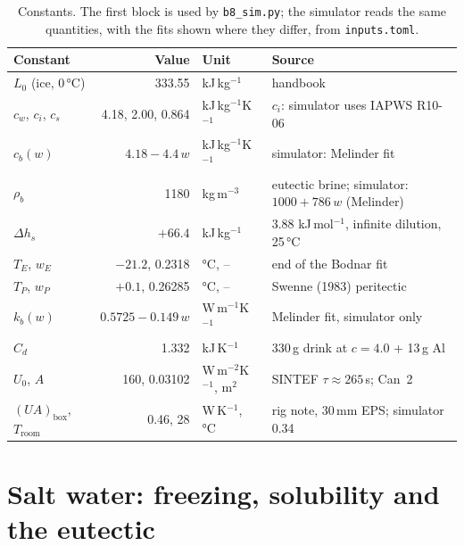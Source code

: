 \documentclass[11pt,a4paper]{article}
\newcommand{\code}[1]{\texttt{#1}}
\begin{document}
\begin{table}[t]
\centering\small
\caption{Constants. The first block is used by \code{b8\_sim.py}; the simulator reads the same
quantities, with the fits shown where they differ, from \code{inputs.toml}.}
\label{tab:constants}
\begin{tabular}{@{}l r l l@{}}
\toprule
Constant & Value & Unit & Source \\ \midrule
$L_0$ (ice, 0\,°C) & 333.55 & kJ\,kg$^{-1}$ & handbook \\
$c_w$, $c_i$, $c_s$ & 4.18, 2.00, 0.864 & kJ\,kg$^{-1}$K$^{-1}$ & $c_i$: simulator uses IAPWS R10-06 \\
$c_b(w)$ & $4.18 - 4.4\,w$ & kJ\,kg$^{-1}$K$^{-1}$ & simulator: Melinder fit \\
$\rho_b$ & 1180 & kg\,m$^{-3}$ & eutectic brine; simulator: $1000 + 786\,w$ (Melinder) \\
$\Delta h_s$ & $+66.4$ & kJ\,kg$^{-1}$ & 3.88 kJ\,mol$^{-1}$, infinite dilution, 25\,°C \\
$T_E$, $w_E$ & $-21.2$, 0.2318 & °C, – & end of the Bodnar fit \\
$T_P$, $w_P$ & $+0.1$, 0.26285 & °C, – & Swenne (1983) peritectic \\
$k_b(w)$ & $0.5725 - 0.149\,w$ & W\,m$^{-1}$K$^{-1}$ & Melinder fit, simulator only \\
$C_d$ & 1.332 & kJ\,K$^{-1}$ & 330\,g drink at $c = 4.0$ + 13\,g Al \\
$U_0$, $A$ & 160, 0.03102 & W\,m$^{-2}$K$^{-1}$, m$^2$ & SINTEF $\tau \approx 265$\,s; Can~2 \\
$(UA)_{\text{box}}$, $T_{\text{room}}$ & 0.46, 28 & W\,K$^{-1}$, °C & rig note, 30\,mm EPS; simulator 0.34 \\
\bottomrule
\end{tabular}
\end{table}

\section{Salt water: freezing, solubility and the eutectic}
\label{sec:phase}
\end{document}

